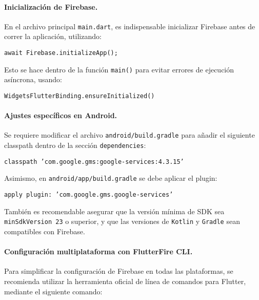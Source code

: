 \vspace{1em}

\paragraph{Inicialización de Firebase.}  
En el archivo principal \texttt{main.dart}, es indispensable inicializar Firebase antes de correr la aplicación, utilizando:

\begin{center}
  \texttt{await Firebase.initializeApp();}
\end{center}

Esto se hace dentro de la función \texttt{main()} para evitar errores de ejecución asíncrona, usando:
\begin{center}
  \texttt{WidgetsFlutterBinding.ensureInitialized()}
\end{center}

\vspace{1em}

\paragraph{Ajustes específicos en Android.}  
Se requiere modificar el archivo \texttt{android/build.gradle} para añadir el siguiente classpath dentro de la sección \texttt{dependencies}:

\begin{center}
  \texttt{classpath 'com.google.gms:google-services:4.3.15'}
\end{center}

Asimismo, en \texttt{android/app/build.gradle} se debe aplicar el plugin:

\begin{center}
  \texttt{apply plugin: 'com.google.gms.google-services'}
\end{center}

También es recomendable asegurar que la versión mínima de SDK sea \texttt{minSdkVersion 23} o superior, y que las versiones de \texttt{Kotlin} y \texttt{Gradle} sean compatibles con Firebase.

\vspace{1em}

\paragraph{Configuración multiplataforma con FlutterFire CLI.}  
Para simplificar la configuración de Firebase en todas las plataformas, se recomienda utilizar la herramienta oficial de línea de comandos para Flutter, mediante el siguiente comando:

